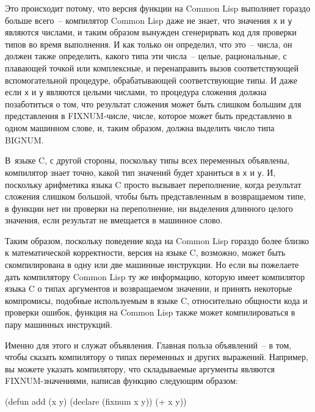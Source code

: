Это происходит потому, что версия функции на Common Lisp выполняет гораздо больше
всего~-- компилятор Common Lisp даже не знает, что значения \lstinline{x} и \lstinline{y} являются
числами, и таким образом вынужден сгенерирвать код для проверки типов во время выполнения.
И как только он определил, что это~-- числа, он должен также определить, какого типа эти
числа~-- целые, рациональные, с плавающей точкой или комплексные, и перенаправить вызов
соответствующей вспомогательной процедуре, обрабатывающей соответствующие типы. И даже
если \lstinline{x} и \lstinline{y} являются целыми числами, то процедура сложения должна
позаботиться о том, что результат сложения может быть слишком большим для представления в
FIXNUM-числе, числе, которое может быть представлено в одном машинном слове, и, таким
образом, должна выделить число типа BIGNUM.

В~языке C, с другой стороны, поскольку типы всех переменных объявлены, компилятор знает
точно, какой тип значений будет храниться в \lstinline{x} и \lstinline{y}. И, поскольку арифметика
языка C просто вызывает переполнение, когда результат сложения слишком большой, чтобы быть
представленным в возвращаемом типе, в функции нет ни проверки на переполнение, ни
выделения длинного целого значения, если результат не вмещается в машинное слово.

Таким образом, поскольку поведение кода на Common Lisp гораздо более близко к
математической корректности, версия на языке C, возможно, может быть скомпилирована в одну
или две машинные инструкции. Но если вы пожелаете дать компилятору Common Lisp ту же
информацию, которую имеет компилятор языка C о типах аргументов и возвращаемом значении, и
принять некоторые компромисы, подобные используемым в языке C, относительно общности кода
и проверки ошибок, функция на Common Lisp также может компилироваться в пару машинных
инструкций.

Именно для этого и служат объявления. Главная польза объявлений~-- в том, чтобы сказать
компилятору о типах переменных и других выражений. Например, вы можете указать
компилятору, что складываемые аргументы являются FIXNUM-значениями, написав функцию
следующим образом:

\begin{myverb}
(defun add (x y)
  (declare (fixnum x y))
  (+ x y))
\end{myverb}

